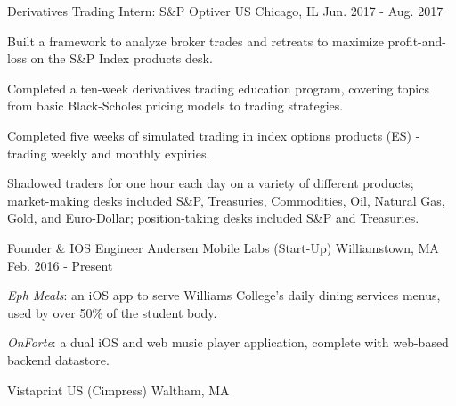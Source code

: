 

\begin{cventries}

  \cventry
    {Derivatives Trading Intern: S\&P} %
    {Optiver US} %
    {Chicago, IL} %
    {Jun. 2017 - Aug. 2017} %
    {
      \begin{cvitems} %
        \item {Built a framework to analyze broker trades and retreats to maximize profit-and-loss on the S\&P Index products desk.}
        \item {Completed a ten-week derivatives trading education program, covering topics from basic Black-Scholes pricing models to trading strategies.}
        \item {Completed five weeks of simulated trading in index options products (ES) - trading weekly and monthly expiries.}
        \item {Shadowed traders for one hour each day on a variety of different products; market-making desks included S\&P, Treasuries, Commodities, Oil, Natural Gas, Gold, and Euro-Dollar; position-taking desks included S\&P and Treasuries.}
      \end{cvitems}
    }

  \cventry
    {Founder \& IOS Engineer} %
    {Andersen Mobile Labs (Start-Up)} %
    {Williamstown, MA} %
    {Feb. 2016 - Present} %
    {
      \begin{cvitems} %
        \item {\textit{Eph Meals}: an iOS app to serve Williams College's daily dining services menus, used by over 50\% of the student body.}
        \item {\textit{OnForte}: a dual iOS and web music player application, complete with web-based backend datastore.}
      \end{cvitems}
    }

\cvexperienceheader
{Vistaprint US (Cimpress)} %
{Waltham, MA} %


\end{cventries}
